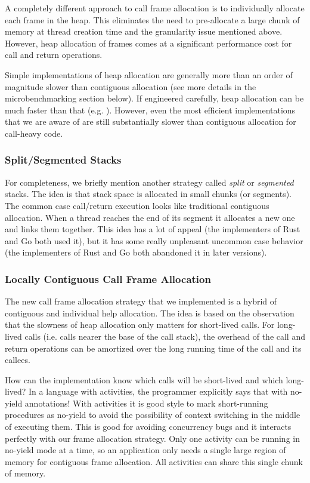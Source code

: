 \documentclass[10pt,preprint]{sigplanconf}
\begin{document}
A completely different approach to call frame allocation is to individually allocate each frame in the heap.
This eliminates the need to pre-allocate a large chunk of memory at thread creation time and the granularity issue mentioned above.
However, heap allocation of frames comes at a significant performance cost for call and return operations.

Simple implementations of heap allocation are generally more than an order of magnitude slower than contiguous allocation (see more details in the microbenchmarking section below).
If engineered carefully, heap allocation can be much faster than that (e.g. \cite{Shao2000}).
However, even the most efficient implementations that we are aware of are still substantially slower than contiguous allocation for call-heavy code.

\subsubsection{Split/Segmented Stacks}

For completeness, we briefly mention another strategy called \emph{split} or \emph{segmented} stacks.
The idea is that stack space is allocated in small chunks (or segments).
The common case call/return execution looks like traditional contiguous allocation.
When a thread reaches the end of its segment it allocates a new one and links them together.
This idea has a lot of appeal (the implementers of Rust and Go both used it), but it has some really unpleasant uncommon case behavior (the implementers of Rust and Go both
abandoned it in later versions).

\subsubsection{Locally Contiguous Call Frame Allocation}

The new call frame allocation strategy that we implemented is a hybrid of contiguous and individual help allocation.
The idea is based on the observation that the slowness of heap allocation only matters for short-lived calls.
For long-lived calls (i.e. calls nearer the base of the call stack), the overhead of the call and return operations can be amortized over the long running time of the call and its callees.

How can the implementation know which calls will be short-lived and which long-lived?
In a language with activities, the programmer explicitly says that with no-yield annotations!
With activities it is good style to mark short-running procedures as no-yield to avoid the possibility of context switching in the middle of executing them.
This is good for avoiding concurrency bugs and it interacts perfectly with our frame allocation strategy.
Only one activity can be running in no-yield mode at a time, so an application only needs a single large region of memory for contiguous frame allocation.
All activities can share this single chunk of memory.
\end{document}
